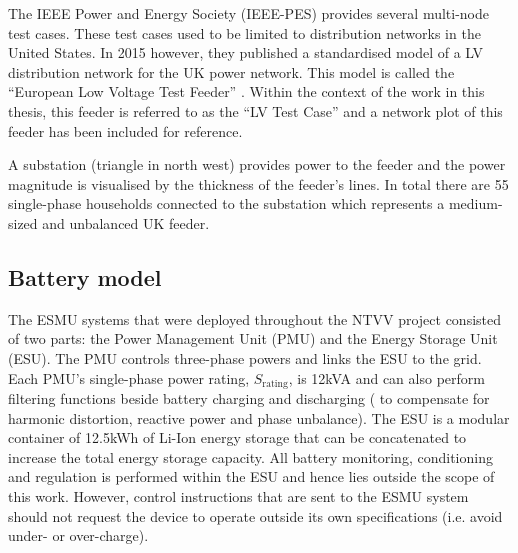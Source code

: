 The IEEE Power and Energy Society (IEEE-PES) provides several multi-node test cases.
These test cases used to be limited to distribution networks in the United States.
In 2015 however, they published a standardised model of a LV distribution network for the UK power network.
This model is called the ``European Low Voltage Test Feeder'' \cite{DistributionTestFeeders2017}.
Within the context of the work in this thesis, this feeder is referred to as the ``LV Test Case'' and a network plot of this feeder has been included for reference.



A substation (triangle in north west) provides power to the feeder and the power magnitude is visualised by the thickness of the feeder's lines.
In total there are 55 single-phase households connected to the substation which represents a medium-sized and unbalanced UK feeder.

\subsection{Battery model}
\label{ch1:subsec:battery-model}


The ESMU systems that were deployed throughout the NTVV project consisted of two parts: the Power Management Unit (PMU) and the Energy Storage Unit (ESU).
The PMU controls three-phase powers and links the ESU to the grid.
Each PMU's single-phase power rating, $S_\text{rating}$, is 12kVA and can also perform filtering functions beside battery charging and discharging ( to compensate for harmonic distortion, reactive power and phase unbalance).
The ESU is a modular container of 12.5kWh of Li-Ion energy storage that can be concatenated to increase the total energy storage capacity.
All battery monitoring, conditioning and regulation is performed within the ESU and hence lies outside the scope of this work.
However, control instructions that are sent to the ESMU system should not request the device to operate outside its own specifications (i.e. avoid under- or over-charge).

\nomenclature[I]{$\eta$}{Round-trip efficiency of power electronics, where $\eta \in (0, 1]$}

